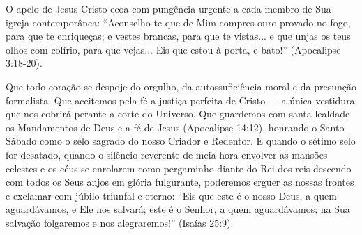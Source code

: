O apelo de Jesus Cristo ecoa com pungência urgente a cada membro de Sua igreja contemporânea:
``Aconselho-te que de Mim compres ouro provado no fogo, para que te enriqueças; e vestes brancas, para que te vistas... e que unjas os teus olhos com colírio, para que vejas... Eis que estou à porta, e bato!'' (Apocalipse 3:18-20).

Que todo coração se despoje do orgulho, da autossuficiência moral e da presunção formalista. Que aceitemos pela fé a justiça perfeita de Cristo — a única vestidura que nos cobrirá perante a corte do Universo. Que guardemos com santa lealdade os Mandamentos de Deus e a fé de Jesus (Apocalipse 14:12), honrando o Santo Sábado como o selo sagrado do nosso Criador e Redentor.
E quando o sétimo selo for desatado, quando o silêncio reverente de meia hora envolver as mansões celestes e os céus se enrolarem como pergaminho diante do Rei dos reis descendo com todos os Seus anjos em glória fulgurante, poderemos erguer as nossas frontes e exclamar com júbilo triunfal e eterno:
``Eis que este é o nosso Deus, a quem aguardávamos, e Ele nos salvará; este é o Senhor, a quem aguardávamos; na Sua salvação folgaremos e nos alegraremos!'' (Isaías 25:9).
